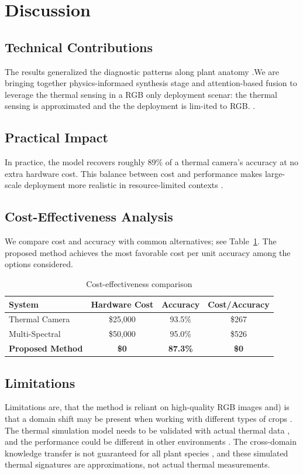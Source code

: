 \documentclass[utf8]{FrontiersinHarvard} %
\begin{document}
\section{Discussion}

\subsection{Technical Contributions}
The results generalized the diagnostic patterns along plant anatomy \cite{hassan2021}.We are bringing together physics-informaed synthesis stage \cite{raissi2019} and attention-based fusion to leverage the thermal sensing in a RGB only deployment scenar: the thermal sensing is approximated and the the deployment is lim-ited to RGB. \cite{hu2020}. 

\subsection{Practical Impact}
In practice, the model recovers roughly 89\% of a thermal camera’s accuracy at no extra hardware cost. This balance between cost and performance makes large-scale deployment more realistic in resource-limited contexts \cite{temniranrat2021,benos2021}.

\subsection{Cost-Effectiveness Analysis}
We compare cost and accuracy with common alternatives; see Table~\ref{tab:cost}. The proposed method achieves the most favorable cost per unit accuracy among the options considered.

\begin{table}[h!]
    \centering
    \caption{Cost-effectiveness comparison}
    \label{tab:cost}
    \footnotesize
    \begin{tabular}{lccc}
        \toprule
        \textbf{System} & \textbf{Hardware Cost} & \textbf{Accuracy} & \textbf{Cost/Accuracy} \\
        \midrule
        Thermal Camera & \$25,000 & 93.5\% & \$267 \\
        Multi-Spectral & \$50,000 & 95.0\% & \$526 \\
        \textbf{Proposed Method} & \textbf{\$0} & \textbf{87.3\%} & \textbf{\$0} \\
        \bottomrule
    \end{tabular}
\end{table}

\subsection{Limitations}
Limitations are, that the method is reliant on high-quality RGB images and) is that a domain shift may be present when working with different types of crops \cite{kouidri2021}. The thermal simulation model needs to be validated with actual thermal data \cite{zhai2020}, and the performance could be different in other environments \cite{furbank2011}. The cross-domain knowledge transfer is not guaranteed for all plant species \cite{weiss2016}, and these simulated thermal signatures are approximations, not actual thermal measurements. 
\end{document}
